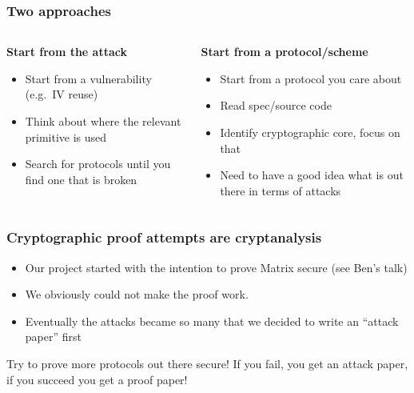 \documentclass[aspectratio=169]{beamer}
\begin{document}
\begin{frame}
  \frametitle{Two approaches}

  \begin{columns}
    \begin{column}{0.5\columnwidth}
      \textbf{Start from the attack}
      \begin{itemize}
      \item Start from a vulnerability (e.g.~IV reuse)
      \item Think about where the relevant primitive is used
      \item Search for protocols until you find one that is broken
      \end{itemize}
    \end{column}
    \begin{column}{0.5\columnwidth}
      \textbf{Start from a protocol/scheme}
      \begin{itemize}
      \item Start from a protocol you care about
      \item Read spec/source code
      \item Identify cryptographic core, focus on that
      \item Need to have a good idea what is out there in terms of attacks
      \end{itemize}
    \end{column}
\end{columns}

\end{frame}

\begin{frame}
  \frametitle{Cryptographic proof attempts are cryptanalysis}

  \begin{itemize}
  \item Our project started with the intention to prove Matrix secure (see Ben's talk)
  \item We obviously could not make the proof work.
  \item Eventually the attacks became so many that we decided to write an ``attack paper'' first
  \end{itemize}

  Try to prove more protocols out there secure! If you fail, you get an attack paper, if you succeed you get a proof paper!
\end{frame}
\end{document}
